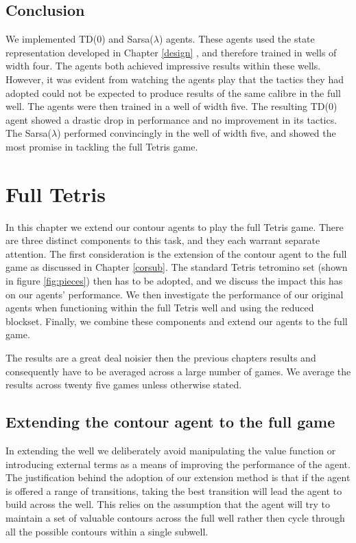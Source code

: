 \documentclass{rucsthesis}
\begin{document}
\section{Conclusion}

We implemented TD(0) and Sarsa($\lambda$) agents. These agents used the state representation developed in Chapter \ref{design} , and therefore trained in wells of width four. The agents both achieved impressive results within these wells. However, it was evident from watching the agents play that the tactics they had adopted could not be expected to produce results of the same calibre in the full well. The agents were then trained in a well of width five. The resulting TD(0) agent showed a drastic drop in performance and no improvement in its tactics. The Sarsa($\lambda$) performed convincingly in the well of width five, and showed the most promise in tackling the full Tetris game. 

\chapter{Full Tetris}

In this chapter we extend our contour agents to play the full Tetris game. There are three distinct components to this task, and they each warrant separate attention. The first consideration is the extension of the contour agent to the full game as discussed in Chapter \ref{corsub}. The standard Tetris tetromino set (shown in figure \ref{fig:pieces}) then has to be adopted, and we discuss the impact this has on our agents' performance. We then investigate the performance of our original agents when functioning within the full Tetris well and using the reduced blockset. Finally, we combine these components and extend our agents to the full game.

The results are a great deal noisier then the previous chapters results and consequently have to be averaged across a large number of games. We average the results across twenty five games unless otherwise stated.

\section{Extending the contour agent to the full game \label{m2s}}

In extending the well we deliberately avoid manipulating the value function or introducing external terms as a means of improving the performance of the agent. The justification behind the adoption of our extension method is that if the agent is offered a range of transitions, taking the best transition will lead the agent to build across the well. This relies on the assumption that the agent will try to maintain a set of valuable contours across the full well rather then cycle through all the possible contours within a single subwell.
\end{document}
